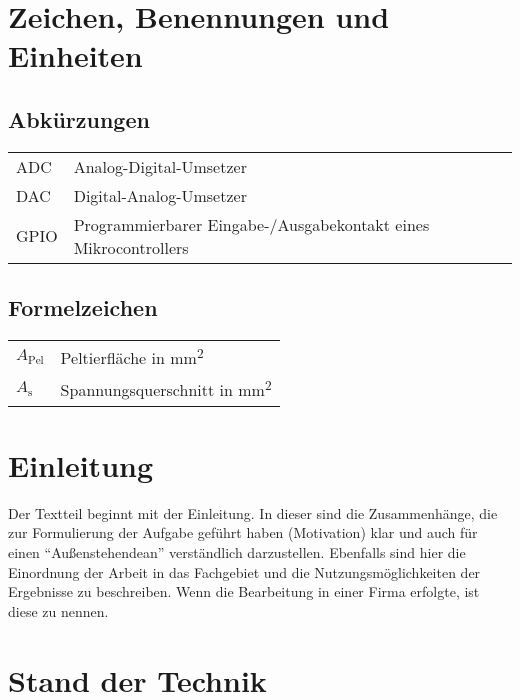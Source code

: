 \documentclass[%
  paper=a4,
  fontsize=12pt,
  twoside=false,
  headsepline=true,
  numbers=noenddot]{scrartcl}
\begin{document}
\section*{Zeichen, Benennungen und Einheiten}

\subsection*{Abkürzungen}

\begin{tabular}{ll}
ADC&			Analog-Digital-Umsetzer\\
DAC&			Digital-Analog-Umsetzer\\
GPIO&			Programmierbarer Eingabe-/Ausgabekontakt eines Mikrocontrollers\\
\end{tabular}

\subsection*{Formelzeichen}

\begin{tabular}{ll}
  $A_\text{Pel}$ & Peltierfläche in \si{\milli\metre\squared}\\
  $A_\text{s}$ & Spannungsquerschnitt in \si{\milli\metre\squared}\\
\end{tabular}

\cleardoublepage
{}


\section{Einleitung}

Der Textteil beginnt mit der Einleitung. In dieser  sind die Zusammenhänge, die zur
Formulierung der Aufgabe geführt haben (Motivation) klar und auch für einen "`Außenstehendean"' verständlich darzustellen. Ebenfalls sind hier die Einordnung der Arbeit in das
Fachgebiet und die Nutzungsmöglichkeiten der Ergebnisse zu beschreiben. Wenn die
Bearbeitung in einer Firma erfolgte, ist diese zu nennen.


\section{Stand der Technik}
%
\end{document}
